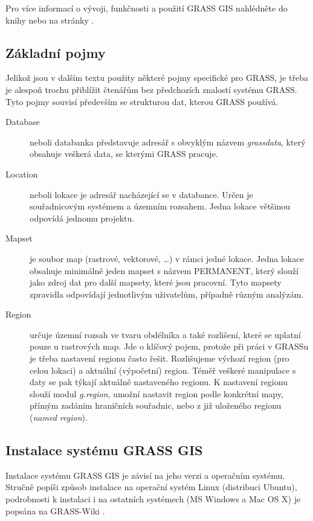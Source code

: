 \documentclass[a4paper,12pt,draft]{article}
\begin{document}
Pro více informací o vývoji, funkčnosti a použití GRASS GIS nahlédněte do knihy \cite{grass_gis} nebo na stránky \cite{grass_page}.

\subsection{Základní pojmy}
\label{sec:grass:pojmy}
Jelikož jsou v dalším textu použity některé pojmy specifické pro GRASS, je třeba je alespoň trochu přiblížit čtenářům bez předchozích znalostí systému GRASS. Tyto pojmy souvisí především se strukturou dat, kterou GRASS používá.

\begin{description}
\item[Database] neboli databanka představuje adresář s obvyklým názvem \emph{grassdata}, který obsahuje veškerá data, se kterými GRASS pracuje.
\item [Location] neboli lokace je adresář nacházející se v databance. Určen je souřadnicovým systémem a územním rozsahem. Jedna lokace většinou odpovídá jednomu projektu.
\item [Mapset] je soubor map (rastrové, vektorové, \ldots) v rámci jedné lokace. Jedna lokace obsahuje minimálně jeden mapset s názvem PERMANENT, který  slouží jako zdroj dat pro další mapsety, které jsou pracovní. Tyto mapsety zpravidla odpovídají jednotlivým uživatelům, případně různým analýzám.
\item [Region] určuje územní rozsah ve tvaru obdélníka a také rozlišení, které se uplatní pouze u rastrových map. Jde o klíčový pojem, protože při práci v GRASSu je třeba nastavení regionu často řešit.  Rozlišujeme výchozí region (pro celou lokaci) a aktuální (výpočetní) region. Téměř veškeré manipulace s daty se pak týkají aktuálně nastaveného regionu. K nastavení regionu slouží modul \emph{g.region}, umožní nastavit region podle konkrétní mapy, přímým zadáním hraničních souřadnic, nebo z již uloženého regionu (\emph{named region}). 
 \end{description}

\subsection{Instalace systému GRASS GIS}
Instalace systému GRASS GIS je závisí na jeho verzi a operačním systému. Stručně popíši způsob instalace na operační systém Linux (distribuci Ubuntu), podrobnosti k instalaci i na ostatních systémech (MS Windows a Mac OS X) je popsána na GRASS-Wiki \cite{instalace}.
\end{document}
